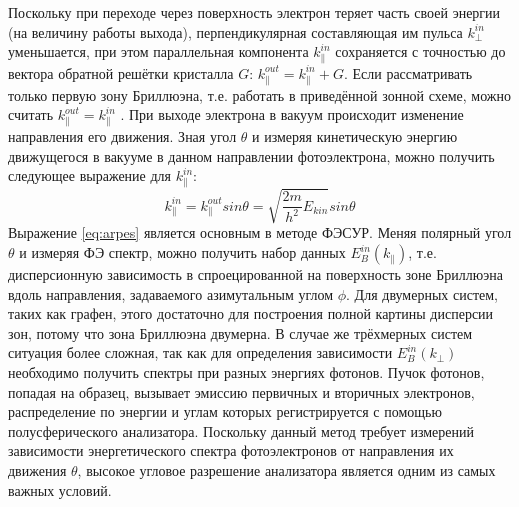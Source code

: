 Поскольку при переходе через поверхность электрон теряет часть своей энергии (на величину работы выхода), перпендикулярная составляющая им
пульса $k^{in}_\perp$ уменьшается, при этом параллельная компонента $k^{in}_\parallel$ сохраняется с точностью до вектора обратной решётки кристалла $G$: $k^{out}_\parallel=k^{in}_\parallel+G$. Если рассматривать только первую зону Бриллюэна, т.е. работать в приведённой зонной схеме, можно считать $k^{out}_\parallel=k^{in}_\parallel$ . При выходе электрона в вакуум происходит изменение направления его движения. Зная угол $\theta$ и измеряя кинетическую энергию движущегося в вакууме в данном направлении фотоэлектрона, можно получить следующее выражение для $k^{in}_\parallel$:
\begin{equation}
\label{eq:arpes}
k^{in}_\parallel=k^{out}_\parallel sin\theta=\sqrt{\frac{2m}{h^2}E_{kin}}sin\theta
\end{equation}
Выражение \ref{eq:arpes} является основным в методе ФЭСУР. Меняя полярный угол $\theta$ и измеряя ФЭ спектр, можно получить набор данных $E^{in}_B(k_\parallel)$, т.е. дисперсионную зависимость в спроецированной на поверхность зоне Бриллюэна вдоль направления, задаваемого азимутальным углом $\phi$. Для двумерных систем, таких как графен, этого достаточно для построения полной картины дисперсии зон, потому что зона Бриллюэна двумерна. В случае же трёхмерных систем ситуация более сложная, так как для определения зависимости $E^{in}_B(k_\perp)$ необходимо получить спектры при разных энергиях фотонов.
 Пучок фотонов, попадая на образец, вызывает эмиссию первичных и вторичных электронов, распределение по энергии и углам которых регистрируется с помощью полусферического анализатора. Поскольку данный метод требует измерений зависимости энергетического спектра фотоэлектронов от направления их движения $\theta$, высокое угловое разрешение анализатора является одним из самых важных условий.


